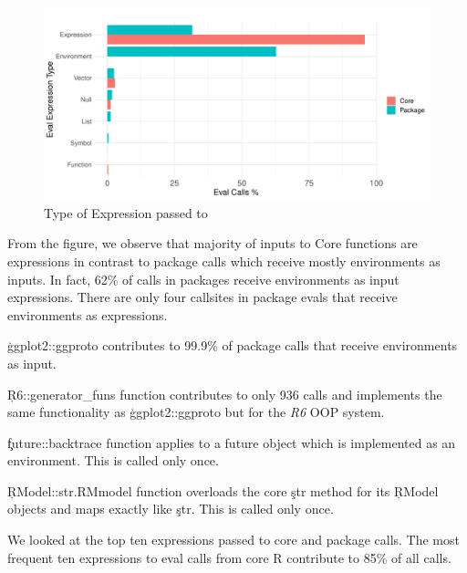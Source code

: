 \documentclass[conference]{IEEEtran}
\newcommand{\PackageEnvironmentInputEvalCallPerc}{62\%\xspace}
\begin{document}
\begin{figure}[!h]
  \centering
  \includegraphics[width=\columnwidth]{eval-expression-kind}
  \caption{Type of Expression passed to \eval} \label{fig:eval-expression-kind}
\end{figure}

From the figure, we observe that majority of inputs to Core \eval functions
are expressions in contrast to package \eval calls which receive mostly
environments as inputs. In fact, \PackageEnvironmentInputEvalCallPerc of
\eval calls in packages receive environments as input expressions. There are
only four callsites in package evals that receive environments as
expressions.
\begin{compactitem}[$-$]
\item \c{ggplot2::ggproto} contributes to 99.9\% of package \eval calls that
  receive environments as input.
\item \c{R6::generator_funs} function contributes to only 936 \eval calls and
implements the same functionality as \c{ggplot2::ggproto} but for the \emph{R6}
OOP system.
\item \c{future::backtrace} function applies \eval to a future object which
  is implemented as an environment. This is called only once.
\item \c{RModel::str.RMmodel} function overloads the core \c{str} method for its
\c{RModel} objects and maps \eval exactly like \c{str}. This is called only
once.
\end{compactitem}

We looked at the top ten expressions passed to core and package \eval
calls. The most frequent ten expressions to eval calls from core R
contribute to 85\% of all \eval calls.
\end{document}
